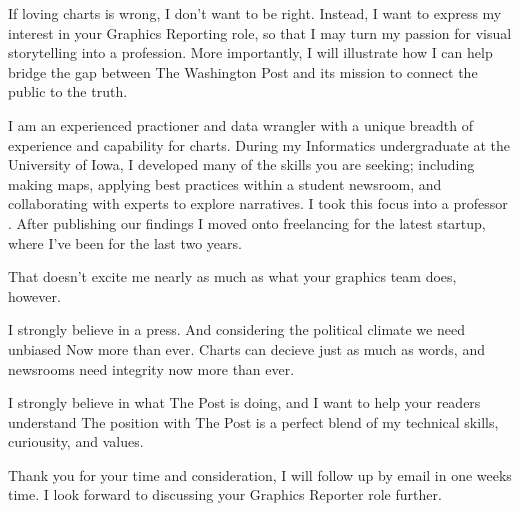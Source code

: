 \begin{cvletter}
  If loving charts is wrong, I don’t want to be right.
  Instead, I want to express my interest in your Graphics Reporting role, so that I may turn my passion for visual storytelling into a profession.
  More importantly, I will illustrate how I can help bridge the gap between The Washington Post and its mission to connect the public to the truth.


  I am an experienced practioner and data wrangler with a unique breadth of experience and capability for charts.
  During my Informatics undergraduate at the University of Iowa, I developed many of the skills you are seeking; including making maps, applying best practices within a student newsroom, and collaborating with experts to explore narratives.
  I took this focus into a professor .
  After publishing our findings I moved onto freelancing for the latest startup, where I've been for the last two years.

  That doesn't excite me nearly as much as what your graphics team does, however.

  I strongly believe in a  press.
  And considering the political climate we need unbiased Now more than ever.
  Charts can decieve just as much as words, and newsrooms need integrity now more than ever.

  I strongly believe in what The Post is doing, and I want to help your readers understand
  The position with The Post is a perfect blend of my technical skills, curiousity, and values.

  Thank you for your time and consideration, I will follow up by email in one weeks time.
  I look forward to discussing your Graphics Reporter role further.
\end{cvletter}
